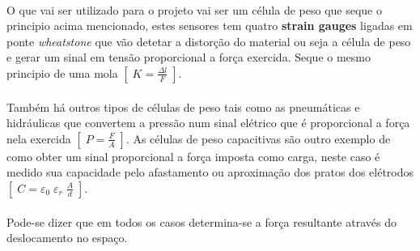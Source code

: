 \\
O que vai ser utilizado para o projeto vai ser um célula de peso que seque o principio acima mencionado, estes sensores tem quatro \textbf{strain gauges} ligadas em ponte \textit{wheatstone} que vão detetar a distorção do material ou seja a célula de peso e gerar um sinal em tensão proporcional a força exercida. Seque o mesmo principio de uma mola $ [ \; K = \frac{\Delta l}{F} \; ] $.
\\
\\
Também há outros tipos de células de peso tais como as pneumáticas e hidráulicas que convertem a pressão num sinal elétrico que é proporcional a força nela exercida $ [ \; P = \frac{F}{A} \; ] $. As células de peso capacitivas são outro exemplo de como obter um sinal proporcional a força imposta como carga, neste caso é medido sua capacidade pelo afastamento ou aproximação dos pratos dos elétrodos $ [ \; C = \varepsilon_{0} \; \varepsilon_{r} \; \frac{A}{d} \; ] $.
\\
\\
Pode-se dizer que em todos os casos determina-se a força resultante através do deslocamento no espaço.


